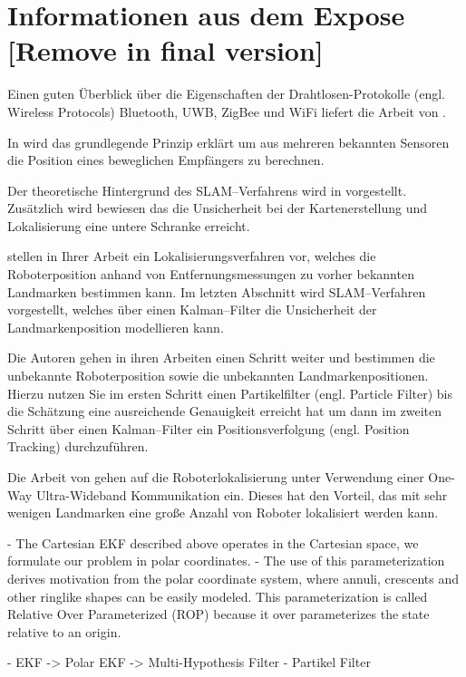 \section{Informationen aus dem Expose [Remove in final version]}

Einen guten Überblick über die Eigenschaften der Drahtlosen-Protokolle (engl. Wireless Protocols) Bluetooth, UWB, ZigBee und WiFi liefert die Arbeit \cite{lee2007comparative} von \citeauthor{lee2007comparative}.

In \cite{smith1987closed} wird das grundlegende Prinzip erklärt um aus mehreren bekannten Sensoren die Position eines beweglichen Empfängers zu berechnen.

Der theoretische Hintergrund des SLAM--Verfahrens wird in \cite{dissanayake2001solution} vorgestellt. Zusätzlich wird bewiesen das die Unsicherheit bei der Kartenerstellung und Lokalisierung eine untere Schranke erreicht.

\citeauthor{kantor2002preliminary} stellen in Ihrer Arbeit \cite{kantor2002preliminary} ein Lokalisierungsverfahren vor, welches die Roboterposition anhand von Entfernungsmessungen zu vorher bekannten Landmarken bestimmen kann. Im letzten Abschnitt wird SLAM--Verfahren vorgestellt, welches über einen Kalman--Filter die Unsicherheit der Landmarkenposition modellieren kann.

Die Autoren \citeauthor{blanco2008pure} gehen in ihren Arbeiten \cite{blanco2008pure, blanco2008efficient} einen Schritt weiter und bestimmen die unbekannte Roboterposition sowie die unbekannten Landmarkenpositionen. Hierzu nutzen Sie im ersten Schritt einen Partikelfilter (engl. Particle Filter) bis die Schätzung eine ausreichende Genauigkeit erreicht hat um dann im zweiten Schritt über einen Kalman--Filter ein Positionsverfolgung (engl. Position Tracking) durchzuführen.

Die Arbeit \cite{ledergerber2015robot} von \citeauthor{ledergerber2015robot} gehen auf die Roboterlokalisierung unter Verwendung einer One-Way Ultra-Wideband Kommunikation ein. Dieses hat den Vorteil, das mit sehr wenigen Landmarken eine große Anzahl von Roboter lokalisiert werden kann.

- The Cartesian EKF described above operates in the Cartesian space, we formulate our problem in polar coordinates.
- The use of this parameterization derives motivation from the polar coordinate system, where annuli, crescents and other ringlike shapes can be easily modeled. This parameterization is called Relative Over Parameterized (ROP) because it over parameterizes the state relative to an origin.

- EKF -> Polar EKF -> Multi-Hypothesis Filter
- Partikel Filter